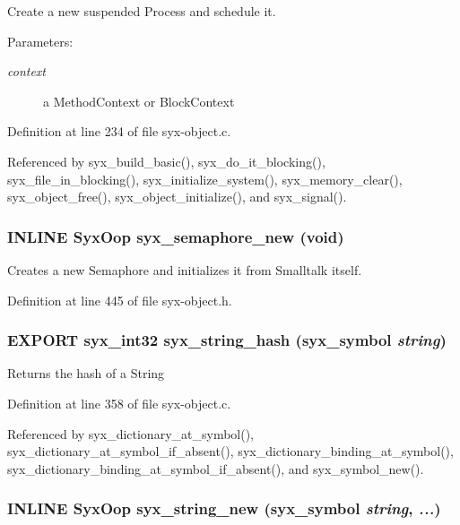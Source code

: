 Create a new suspended Process and schedule it.

\begin{Desc}
\item[Parameters:]
\begin{description}
\item[{\em context}]a MethodContext or BlockContext \end{description}
\end{Desc}


Definition at line 234 of file syx-object.c.

Referenced by syx\_\-build\_\-basic(), syx\_\-do\_\-it\_\-blocking(), syx\_\-file\_\-in\_\-blocking(), syx\_\-initialize\_\-system(), syx\_\-memory\_\-clear(), syx\_\-object\_\-free(), syx\_\-object\_\-initialize(), and syx\_\-signal().\hypertarget{syx-object_8h_1e80c1b5431ace50da81cf2ed99377c0}{
\subsubsection{\setlength{\rightskip}{0pt plus 5cm}INLINE {\bf SyxOop} syx\_\-semaphore\_\-new (void)}}
\label{syx-object_8h_1e80c1b5431ace50da81cf2ed99377c0}


Creates a new Semaphore and initializes it from Smalltalk itself. 

Definition at line 445 of file syx-object.h.\hypertarget{syx-object_8h_20b65111a07600b8b06a64a6f473daab}{
\subsubsection{\setlength{\rightskip}{0pt plus 5cm}EXPORT {\bf syx\_\-int32} syx\_\-string\_\-hash ({\bf syx\_\-symbol} {\em string})}}
\label{syx-object_8h_20b65111a07600b8b06a64a6f473daab}


Returns the hash of a String 

Definition at line 358 of file syx-object.c.

Referenced by syx\_\-dictionary\_\-at\_\-symbol(), syx\_\-dictionary\_\-at\_\-symbol\_\-if\_\-absent(), syx\_\-dictionary\_\-binding\_\-at\_\-symbol(), syx\_\-dictionary\_\-binding\_\-at\_\-symbol\_\-if\_\-absent(), and syx\_\-symbol\_\-new().\hypertarget{syx-object_8h_ef1b7868c0a729cc4f27596291a9e08d}{
\subsubsection{\setlength{\rightskip}{0pt plus 5cm}INLINE {\bf SyxOop} syx\_\-string\_\-new ({\bf syx\_\-symbol} {\em string}, \/   {\em ...})}}
\label{syx-object_8h_ef1b7868c0a729cc4f27596291a9e08d}


